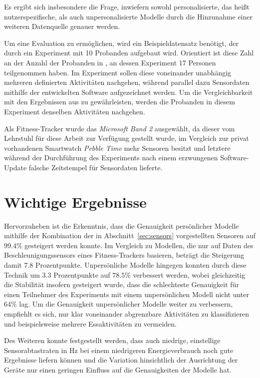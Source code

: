 Es ergibt sich insbesondere die Frage, inwiefern sowohl personalisierte, das heißt nutzerspezifische, als auch unpersonalisierte Modelle durch die Hinzunahme einer weiteren Datenquelle genauer werden.

Um eine Evaluation zu ermöglichen, wird ein Beispieldatensatz benötigt, der durch ein Experiment mit 10 Probanden aufgebaut wird. Orientiert ist diese Zahl an der Anzahl der Probanden in \cite{Weiss2016}, an dessen Experiment 17 Personen teilgenommen haben. Im Experiment sollen diese voneinander unabhängig mehreren definierten Aktivitäten nachgehen, während parallel dazu Sensordaten mithilfe der entwickelten Software aufgezeichnet werden. Um die Vergleichbarkeit mit den Ergebnissen aus \cite{Weiss2016} zu gewährleisten, werden die Probanden in diesem Experiment denselben Aktivitäten nachgehen.

Als Fitness-Tracker wurde das \textit{Microsoft Band 2} ausgewählt, da dieser vom Lehrstuhl für diese Arbeit zur Verfügung gestellt wurde, im Vergleich zur privat vorhandenen Smartwatch \textit{Pebble Time} mehr Sensoren besitzt und letztere während der Durchführung des Experiments nach einem erzwungenen Software-Update falsche Zeitstempel für Sensordaten lieferte. 

\section{Wichtige Ergebnisse}
Hervorzuheben ist die Erkenntnis, dass die Genauigkeit persönlicher Modelle mithilfe der Kombination der in Abschnitt~\ref{sec:sensors} vorgestellten Sensoren auf $99.4 \%$ gesteigert werden konnte. Im Vergleich zu Modellen, die nur auf Daten des Beschleunigungssensors eines Fitness-Trackers basieren, beträgt die Steigerung damit $7.8$ Prozentpunkte. Unpersönliche Modelle hingegen konnten durch diese Technik um $3.3$ Prozentpunkte auf $78.5 \%$ verbessert werden, wobei gleichzeitig die Stabilität insofern gesteigert wurde, dass die schlechteste Genauigkeit für einen Teilnehmer des Experiments mit einem unpersönlichen Modell nicht unter $64 \%$ lag. Um die Genauigkeit unpersönlicher Modelle weiter zu verbessern, empfiehlt es sich, nur klar voneinander abgrenzbare Aktivitäten zu klassifizieren und beispielsweise mehrere Essaktivitäten zu vermeiden.

Des Weiteren konnte festgestellt werden, dass auch niedrige, einstellige Sensorabtastraten in Hz bei einem niedrigeren Energieverbrauch noch gute Ergebnisse liefern können und die Variation hinsichtlich der Ausrichtung der Geräte nur einen geringen Einfluss auf die Genauigkeiten der Modelle hat.

